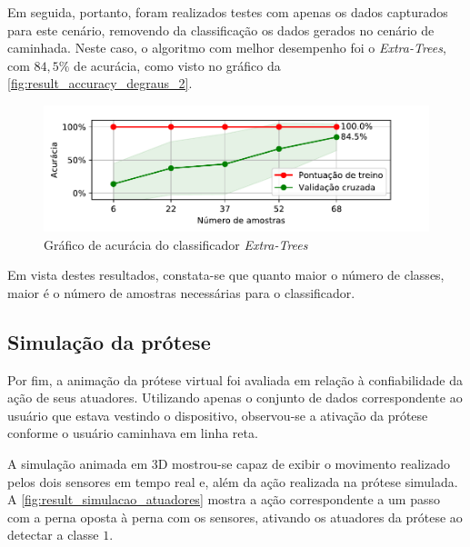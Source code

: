 Em seguida, portanto, foram realizados testes com apenas os dados capturados para este cenário, removendo da classificação os dados gerados no cenário de caminhada. Neste caso, o algoritmo com melhor desempenho foi o \textit{Extra-Trees}, com \(84{,}5\%\) de acurácia, como visto no gráfico da \autoref{fig:result_accuracy_degraus_2}.

\begin{figure}[ht]
	\caption{\label{fig:result_accuracy_degraus_2}Gráfico de acurácia do classificador \textit{Extra-Trees}}
	\begin{center}
	    \includegraphics[width=\textwidth]{resources/result_accuracy_degraus_2}
	\end{center}
\end{figure}

Em vista destes resultados, constata-se que quanto maior o número de classes, maior é o número de amostras necessárias para o classificador. 

\subsection{Simulação da prótese}

Por fim, a animação da prótese virtual foi avaliada em relação à confiabilidade da ação de seus atuadores. Utilizando apenas o conjunto de dados correspondente ao usuário que estava vestindo o dispositivo, observou-se a ativação da prótese conforme o usuário caminhava em linha reta.

A simulação animada em 3D mostrou-se capaz de exibir o movimento realizado pelos dois sensores em tempo real e, além da ação realizada na prótese simulada. A \autoref{fig:result_simulacao_atuadores} mostra a ação correspondente a um passo com a perna oposta à perna com os sensores, ativando os atuadores da prótese ao detectar a classe \(1\).

